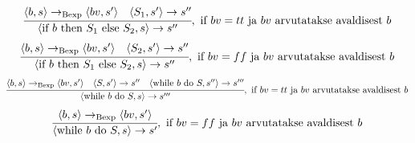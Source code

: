 \[
  \cfrac{
    \langle b, s \rangle \rightarrow _\mathrm{Bexp} \langle bv, s' \rangle
    \quad
    \langle S_1, s' \rangle \rightarrow s''
  }{
    \langle \text{if\ } b \text{\ then\ } S_1 \text{\ else\ } S_2, s \rangle \rightarrow s''
  }, \text{\ if\ } bv = tt \text{\ ja\ } bv \text{\ arvutatakse avaldisest\ } b
\]
\[
  \cfrac{
    \langle b, s \rangle \rightarrow _\mathrm{Bexp} \langle bv, s' \rangle
    \quad
    \langle S_2, s' \rangle \rightarrow s''
  }{
    \langle \text{if\ } b \text{\ then\ } S_1 \text{\ else\ } S_2, s \rangle \rightarrow s''
  }, \text{\ if\ } bv = ff \text{\ ja\ } bv \text{\ arvutatakse avaldisest\ } b
\]
\[
  \cfrac{
    \langle b, s \rangle \rightarrow _\mathrm{Bexp} \langle bv, s' \rangle
    \quad
    \langle S, s' \rangle \rightarrow s''
    \quad
    \langle \text{while\ } b \text{\ do\ } S, s'' \rangle \rightarrow s'''
  }{
    \langle \text{while\ } b \text{\ do\ } S, s \rangle \rightarrow s'''
  }, \text{\ if\ } bv = tt \text{\ ja\ } bv \text{\ arvutatakse avaldisest\ } b
\]
\[
  \cfrac{
    \langle b, s \rangle \rightarrow _\mathrm{Bexp} \langle bv, s' \rangle
  }{
    \langle \text{while\ } b \text{\ do\ } S, s \rangle \rightarrow s'
  }, \text{\ if\ } bv = ff \text{\ ja\ } bv \text{\ arvutatakse avaldisest\ } b
\]
